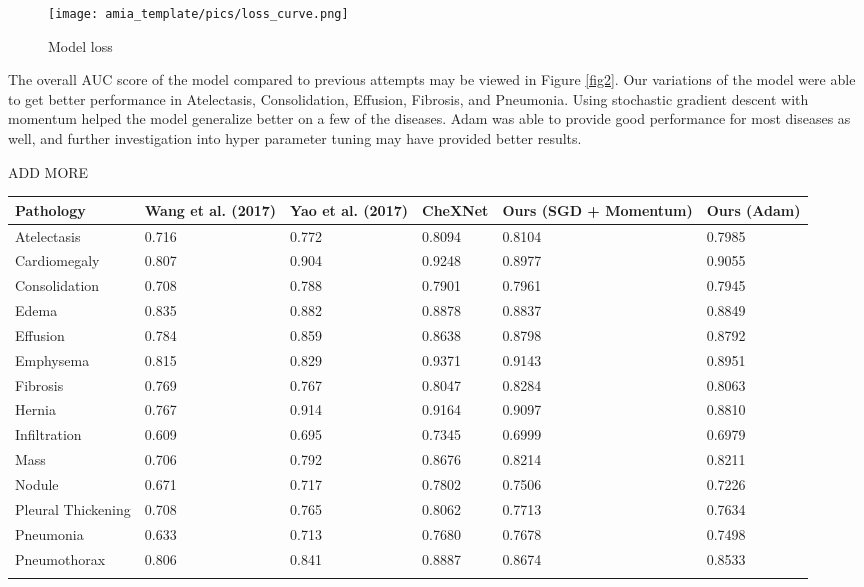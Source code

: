 \documentclass{amia}
\begin{document}
\begin{figure}[h!]
\centering
\texttt{[image: amia\_template/pics/loss\_curve.png]}
\caption{Model loss}
\label{fig1}
\end{figure}

The overall AUC score of the model compared to previous attempts may be viewed in Figure \ref{fig2}. Our variations of the model were able to get better performance in Atelectasis, Consolidation, Effusion, Fibrosis, and Pneumonia. Using stochastic gradient descent with momentum helped the model generalize better on a few of the diseases. Adam was able to provide good performance for most diseases as well, and further investigation into hyper parameter tuning may have provided better results.

ADD MORE

\begin{center}
\begin{tabular}{p{3cm}|p{2cm}|p{2cm}|p{2cm}|p{2cm}|p{2cm}}
Pathology          & Wang et al. (2017) & Yao et al. (2017) & CheXNet & Ours (SGD + Momentum) & Ours (Adam) \\
\midrule
Atelectasis        & 0.716              & 0.772             & 0.8094  & 0.8104     & 0.7985      \\
Cardiomegaly       & 0.807              & 0.904             & 0.9248  & 0.8977     & 0.9055      \\
Consolidation      & 0.708              & 0.788             & 0.7901  & 0.7961     & 0.7945      \\
Edema              & 0.835              & 0.882             & 0.8878  & 0.8837     & 0.8849      \\
Effusion           & 0.784              & 0.859             & 0.8638  & 0.8798     & 0.8792      \\
Emphysema          & 0.815              & 0.829             & 0.9371  & 0.9143     & 0.8951      \\
Fibrosis           & 0.769              & 0.767             & 0.8047  & 0.8284     & 0.8063      \\
Hernia             & 0.767              & 0.914             & 0.9164  & 0.9097     & 0.8810      \\
Infiltration       & 0.609              & 0.695             & 0.7345  & 0.6999     & 0.6979      \\
Mass               & 0.706              & 0.792             & 0.8676  & 0.8214     & 0.8211      \\
Nodule             & 0.671              & 0.717             & 0.7802  & 0.7506     & 0.7226      \\
Pleural Thickening & 0.708              & 0.765             & 0.8062  & 0.7713     & 0.7634      \\
Pneumonia          & 0.633              & 0.713             & 0.7680  & 0.7678     & 0.7498      \\
Pneumothorax       & 0.806              & 0.841             & 0.8887  & 0.8674     & 0.8533      \\
\label{fig2}
\end{tabular}
\end{center}
\end{document}

